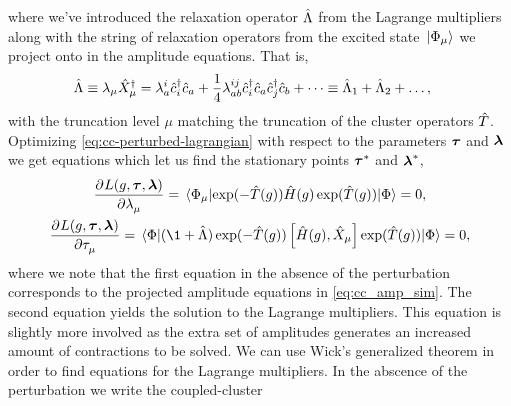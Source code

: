             where we've introduced the relaxation operator $\hat{\Lambda}$ from the
            Lagrange multipliers along with the string of relaxation operators
            from the excited state $\ket*{\Phi_{\mu}}$ we project onto in the
            amplitude equations.
            That is,
            \begin{align}
                \hat{\Lambda}
                &\equiv
                \lambda_{\mu}\hat{X}^{\dagger}_{\mu}
                = \lambda^{i}_{a}\hat{c}_{i}^{\dagger}\hat{c}_{a}
                + \frac{1}{4}\lambda^{ij}_{ab}\hat{c}_{i}^{\dagger}\hat{c}_{a}\hat{c}_{j}^{\dagger}\hat{c}_{b}
                + \dots
                \equiv
                \hat{\Lambda}_1 + \hat{\Lambda}_2 + \dots,
            \end{align}
            with the truncation level $\mu$ matching the truncation of the
            cluster operators $\hat{T}$.
            Optimizing \autoref{eq:cc-perturbed-lagrangian} with respect to the
            parameters $\boldsymbol{\tau}$ and $\boldsymbol{\lambda}$ we get equations
            which let us find the stationary points $\boldsymbol{\tau}^{*}$ and
            $\boldsymbol{\lambda}^{*}$,
            \begin{gather}
                \dpd[]{L(g, \vfg{\clustamp}, \vfg{\clustlamp})}
                {\clustlamp_{\mu}}
                = \mel*{\slat_{\mu}}{
                    \exponential(-\clust(g))
                    \hamil(g)
                    \exponential(\clust(g))
                }{\slat}
                = 0,
                \\
                \dpd[]{L(g, \vfg{\clustamp}, \vfg{\clustlamp})}
                {\clustamp_{\mu}}
                = \mel*{\slat}{
                    (\1 + \clustl)
                    \exponential(-\clust(g))
                    \com{\hamil(g)}{\hat{X}_{\mu}}
                    \exponential(\clust(g))
                }{\slat}
                = 0,
            \end{gather}
            where we note that the first equation in the absence of the
            perturbation corresponds to the projected amplitude equations in
            \autoref{eq:cc_amp_sim}.
            The second equation yields the solution to the Lagrange multipliers.
            This equation is slightly more involved as the extra set of
            amplitudes generates an increased amount of contractions to be
            solved.
            We can use Wick's generalized theorem in order to find equations for
            the Lagrange multipliers.
            In the abscence of the perturbation we write the coupled-cluster
